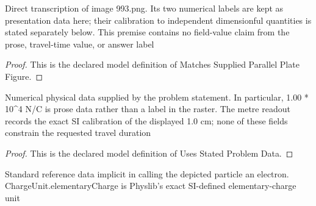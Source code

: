 \begin{definition}
  \label{def:physics:phyx-mini-0993:phyxminiproblems-problemphyxmini0993-matchessuppliedparallelplatefigure}
  Direct transcription of image 993.png. Its two numerical labels are kept as presentation data here; their calibration to independent dimensionful quantities is stated separately below. This premise contains no field-value claim from the prose, travel-time value, or answer label
\end{definition}
\begin{proof}
  This is the declared model definition of Matches Supplied Parallel Plate Figure.
\end{proof}
\begin{definition}
  \label{def:physics:phyx-mini-0993:phyxminiproblems-problemphyxmini0993-usesstatedproblemdata}
  Numerical physical data supplied by the problem statement. In particular, 1.00 * 10\textasciicircum{}4 N/C is prose data rather than a label in the raster. The metre readout records the exact SI calibration of the displayed 1.0 cm; none of these fields constrain the requested travel duration
\end{definition}
\begin{proof}
  This is the declared model definition of Uses Stated Problem Data.
\end{proof}
\begin{definition}
  \label{def:physics:phyx-mini-0993:phyxminiproblems-problemphyxmini0993-usesstandardelectronreferencedata}
  Standard reference data implicit in calling the depicted particle an electron. ChargeUnit.elementaryCharge is Physlib's exact SI-defined elementary-charge unit
\end{definition}

